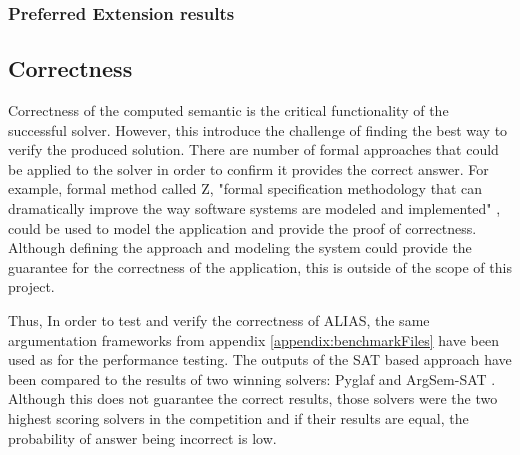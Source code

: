 \subsubsection{Preferred Extension results}

\subsection{Correctness}
Correctness of the computed semantic is the critical functionality of the successful solver. However, this introduce the challenge of finding the best way to verify the produced solution. There are number of formal approaches that could be applied to the solver in order to confirm it provides the correct answer. For example, formal method called Z, "formal specification methodology that can dramatically improve the way software systems are modeled and implemented" \citep{potter1996introduction}, could be used to model the application and provide the proof of correctness. Although defining the approach and modeling the system could provide the guarantee for the correctness of the application, this is outside of the scope of this project. 

Thus, In order to test and verify the correctness of ALIAS, the same argumentation frameworks from appendix \ref{appendix:benchmarkFiles} have been used as for the performance testing. The outputs of the SAT based approach have been compared to the results of two winning solvers: Pyglaf \citep{pyglaf} and ArgSem-SAT \citep{argsemsat}. Although this does not guarantee the correct results, those solvers were the two highest scoring solvers in the competition and if their results are equal, the probability of answer being incorrect is low.
